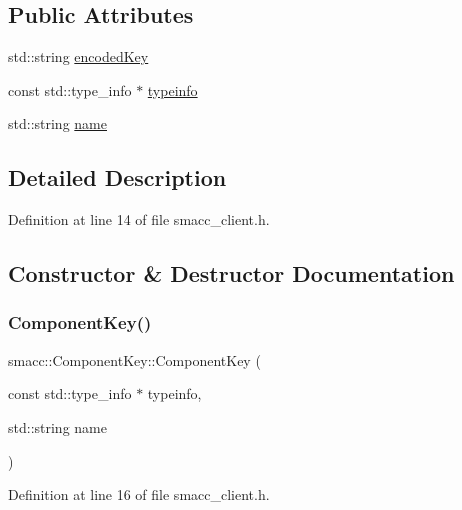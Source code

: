 \subsection*{Public Attributes}
\begin{DoxyCompactItemize}
\item 
std\+::string \hyperlink{structsmacc_1_1ComponentKey_a4f588034d085ba425808d98c36f8a095}{encoded\+Key}
\item 
const std\+::type\+\_\+info $\ast$ \hyperlink{structsmacc_1_1ComponentKey_a148bab7ba01039d4bcabfd93529b333a}{typeinfo}
\item 
std\+::string \hyperlink{structsmacc_1_1ComponentKey_ad38f21bde4dad1dd3c143bdc42e6f30d}{name}
\end{DoxyCompactItemize}


\subsection{Detailed Description}


Definition at line 14 of file smacc\+\_\+client.\+h.



\subsection{Constructor \& Destructor Documentation}
\mbox{\label{structsmacc_1_1ComponentKey_a72c4c29bb7126f5f688a049419cbf0f1}} 
\subsubsection{\texorpdfstring{Component\+Key()}{ComponentKey()}}
{\footnotesize\ttfamily smacc\+::\+Component\+Key\+::\+Component\+Key (\begin{DoxyParamCaption}\item[{const std\+::type\+\_\+info $\ast$}]{typeinfo,  }\item[{std\+::string}]{name }\end{DoxyParamCaption})\hspace{0.3cm}{\ttfamily [inline]}}



Definition at line 16 of file smacc\+\_\+client.\+h.




